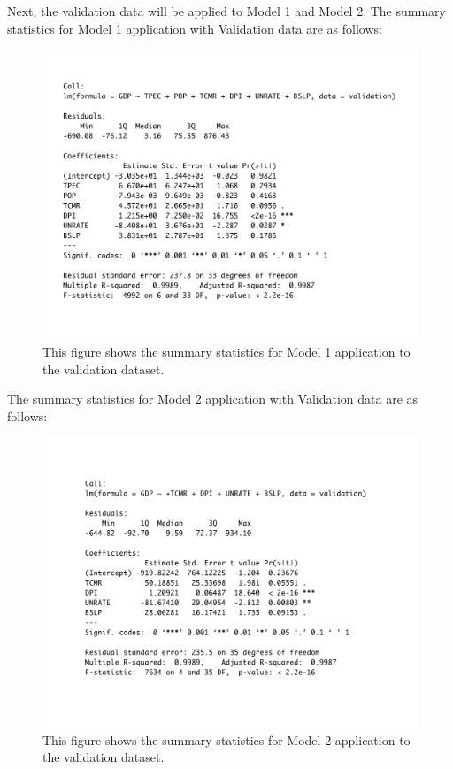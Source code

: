 \documentclass[12pt]{article}
\begin{document}
Next, the validation data will be applied to Model 1 and Model 2. 
The summary statistics for Model 1 application with Validation data are as follows: 
\begin{figure}[H]
  \centering
  \includegraphics[scale = .35]{mod1v}
  \caption{This figure shows the summary statistics for Model 1 application to the validation dataset.}
\end{figure}
The summary statistics for Model 2 application with Validation data are as follows: 
\begin{figure}[H]
  \centering
  \includegraphics[scale = .35]{mod2v}
  \caption{This figure shows the summary statistics for Model 2 application to the validation dataset.}
\end{figure}
\end{document}
